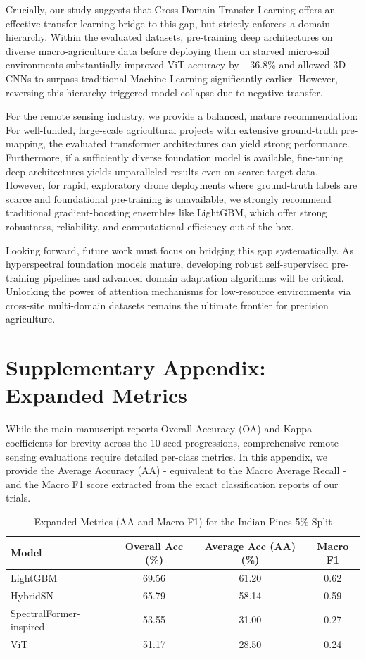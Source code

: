 \documentclass[pdflatex,sn-mathphys-num,iicol]{sn-jnl}
\begin{document}
\par Crucially, our study suggests that Cross-Domain Transfer Learning offers an effective transfer-learning bridge to this gap, but strictly enforces a domain hierarchy. Within the evaluated datasets, pre-training deep architectures on diverse macro-agriculture data before deploying them on starved micro-soil environments substantially improved ViT accuracy by +36.8\% and allowed 3D-CNNs to surpass traditional Machine Learning significantly earlier. However, reversing this hierarchy triggered model collapse due to negative transfer.

\par For the remote sensing industry, we provide a balanced, mature recommendation: For well-funded, large-scale agricultural projects with extensive ground-truth pre-mapping, the evaluated transformer architectures can yield strong performance. Furthermore, if a sufficiently diverse foundation model is available, fine-tuning deep architectures yields unparalleled results even on scarce target data. However, for rapid, exploratory drone deployments where ground-truth labels are scarce and foundational pre-training is unavailable, we strongly recommend traditional gradient-boosting ensembles like LightGBM, which offer strong robustness, reliability, and computational efficiency out of the box.

Looking forward, future work must focus on bridging this gap systematically. As hyperspectral foundation models mature, developing robust self-supervised pre-training pipelines and advanced domain adaptation algorithms will be critical. Unlocking the power of attention mechanisms for low-resource environments via cross-site multi-domain datasets remains the ultimate frontier for precision agriculture.

\section*{Supplementary Appendix: Expanded Metrics}\label{sec:appendix}
While the main manuscript reports Overall Accuracy (OA) and Kappa coefficients for brevity across the 10-seed progressions, comprehensive remote sensing evaluations require detailed per-class metrics. In this appendix, we provide the Average Accuracy (AA) - equivalent to the Macro Average Recall - and the Macro F1 score extracted from the exact classification reports of our trials.

\begin{table}[t]
\centering
\caption{Expanded Metrics (AA and Macro F1) for the Indian Pines 5\% Split}\label{tab:expanded_metrics}
\begin{tabular}{lccc}
\toprule
\textbf{Model} & \textbf{Overall Acc (\%)} & \textbf{Average Acc (AA) (\%)} & \textbf{Macro F1} \\
\midrule
LightGBM & 69.56 & 61.20 & 0.62 \\
HybridSN & 65.79 & 58.14 & 0.59 \\
SpectralFormer-inspired & 53.55 & 31.00 & 0.27 \\
ViT & 51.17 & 28.50 & 0.24 \\
\bottomrule
\end{tabular}
\end{table}
\end{document}
